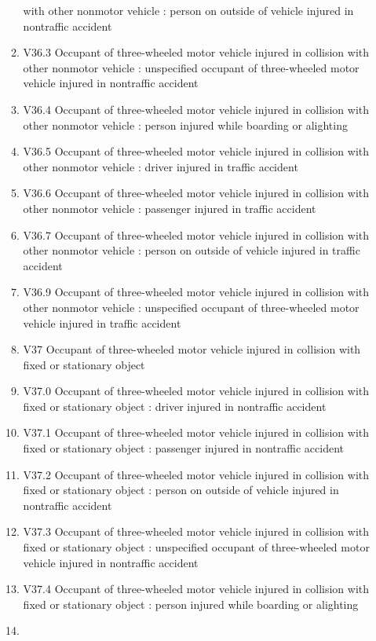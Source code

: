 \documentclass[
]{scrartcl}
\begin{document}
\begin{itemize}
\begin{enumerate}
    with other nonmotor vehicle : person on outside of vehicle injured
    in nontraffic accident
  \item
    V36.3 Occupant of three-wheeled motor vehicle injured in collision
    with other nonmotor vehicle : unspecified occupant of three-wheeled
    motor vehicle injured in nontraffic accident
  \item
    V36.4 Occupant of three-wheeled motor vehicle injured in collision
    with other nonmotor vehicle : person injured while boarding or
    alighting
  \item
    V36.5 Occupant of three-wheeled motor vehicle injured in collision
    with other nonmotor vehicle : driver injured in traffic accident
  \item
    V36.6 Occupant of three-wheeled motor vehicle injured in collision
    with other nonmotor vehicle : passenger injured in traffic accident
  \item
    V36.7 Occupant of three-wheeled motor vehicle injured in collision
    with other nonmotor vehicle : person on outside of vehicle injured
    in traffic accident
  \item
    V36.9 Occupant of three-wheeled motor vehicle injured in collision
    with other nonmotor vehicle : unspecified occupant of three-wheeled
    motor vehicle injured in traffic accident
  \item
    V37 Occupant of three-wheeled motor vehicle injured in collision
    with fixed or stationary object
  \item
    V37.0 Occupant of three-wheeled motor vehicle injured in collision
    with fixed or stationary object : driver injured in nontraffic
    accident
  \item
    V37.1 Occupant of three-wheeled motor vehicle injured in collision
    with fixed or stationary object : passenger injured in nontraffic
    accident
  \item
    V37.2 Occupant of three-wheeled motor vehicle injured in collision
    with fixed or stationary object : person on outside of vehicle
    injured in nontraffic accident
  \item
    V37.3 Occupant of three-wheeled motor vehicle injured in collision
    with fixed or stationary object : unspecified occupant of
    three-wheeled motor vehicle injured in nontraffic accident
  \item
    V37.4 Occupant of three-wheeled motor vehicle injured in collision
    with fixed or stationary object : person injured while boarding or
    alighting
  \item

\end{enumerate}
\end{itemize}
\end{document}
